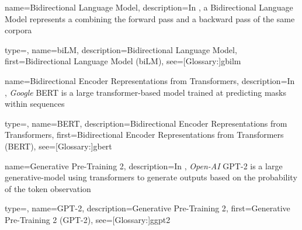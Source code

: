 {
  name={Bidirectional Language Model},
  description={In , a Bidirectional Language Model represents a  combining the forward pass and a backward pass of the same corpora}
}

{
  type=\acronymtype,
  name={biLM},
  description={Bidirectional Language Model},
  first={Bidirectional Language Model (biLM)},
  see=[Glossary:]{gbilm}
}

{
  name={Bidirectional Encoder Representations from Transformers},
  description={In , \textit{Google} BERT is a large \gls{transformer}-based model trained at predicting masks within sequences}
}

{
  type=\acronymtype,
  name={BERT},
  description={Bidirectional Encoder Representations from Transformers},
  first={Bidirectional Encoder Representations from Transformers (BERT)},
  see=[Glossary:]{gbert}
}


{
  name={Generative Pre-Training 2},
  description={In , \textit{Open-AI} GPT-2 is a large \gls{generative-model} using \glspl{transformer} to generate outputs based on the probability of the token observation}
}

{
  type=\acronymtype,
  name={GPT-2},
  description={Generative Pre-Training 2},
  first={Generative Pre-Training 2 (GPT-2)},
  see=[Glossary:]{ggpt2}
}




